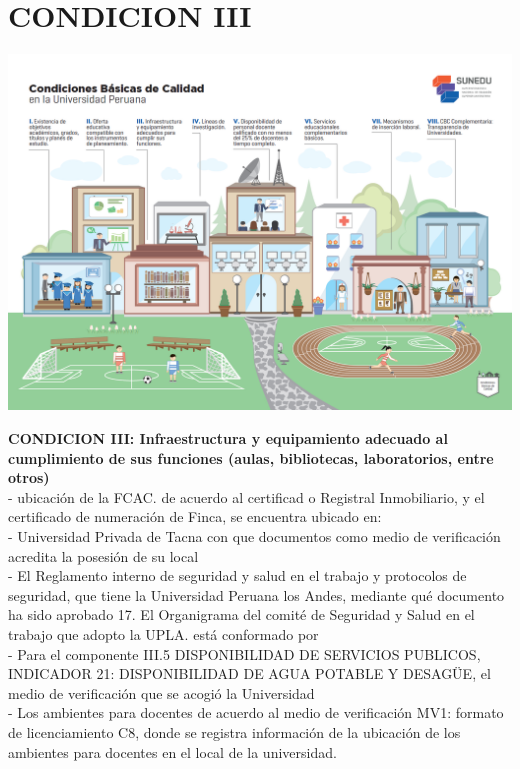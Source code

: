 \section{CONDICION III} 

\vspace{16mm} %
\begin{center}
\includegraphics[width=17cm]{./Imagenes/002}
\end{center}	
\vspace{7mm} %

\textbf{CONDICION III: Infraestructura y equipamiento adecuado al cumplimiento de sus funciones (aulas, bibliotecas, laboratorios, entre otros)}\\
-	ubicación de la FCAC. de acuerdo al certificad o Registral Inmobiliario, y el certificado de numeración de Finca, se encuentra ubicado en: \\
-	Universidad Privada de Tacna con que documentos como medio de verificación acredita la posesión de su local \\
-	El Reglamento interno de seguridad y salud en el trabajo y protocolos de seguridad, que tiene la Universidad Peruana los Andes, mediante qué documento 		ha sido aprobado 17. El Organigrama del comité de Seguridad y Salud en el trabajo que adopto la UPLA. está conformado por\\ 
-	Para el componente III.5 DISPONIBILIDAD DE SERVICIOS PUBLICOS, INDICADOR 21: DISPONIBILIDAD DE AGUA POTABLE Y DESAGÜE, el medio de 			verificación que se acogió la Universidad \\
-	Los ambientes para docentes de acuerdo al medio de verificación MV1: formato de licenciamiento C8, donde se registra información de la ubicación de los 			ambientes para docentes en el local de la universidad.\\

